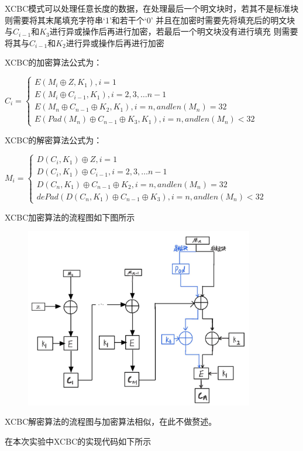 \documentclass[a4paper,11pt,UTF8]{ctexart}
\newcommand{\bottomcaption}{%
\setlength{\abovecaptionskip}{6pt}%
\setlength{\belowcaptionskip}{6pt}%
\caption}
\newcommand{\xiaowuhao}{\fontsize{9pt}{\baselineskip}\selectfont}   %
\begin{document}
            XCBC模式可以处理任意长度的数据，在处理最后一个明文块时，若其不是标准块则需要将其末尾填充字符串‘1’和若干个‘0’
            并且在加密时需要先将填充后的明文块与$C_{i-1}$和$K_{3}$进行异或操作后再进行加密，若最后一个明文块没有进行填充
            则需要将其与$C_{i-1}$和$K_{2}$进行异或操作后再进行加密\par
            XCBC的加密算法公式为：\par
            $C_{i}=\left\{\begin{matrix} E(M_{i}\oplus Z,K_{1}),i=1\\
                 E(M_{i}\oplus C_{i-1},K_{1}),i=2,3,\dots n-1\\
                E(M_{n}\oplus C_{n-1}\oplus K_{2},K_{1}),i=n,and len(M_{n})=32 \\
                E(Pad(M_{n})\oplus C_{n-1}\oplus K_{3},K_{1}),i=n,and len(M_{n})<32
                \end{matrix}\right.$\par
\newpage
            XCBC的解密算法公式为：\par
            $M_{i}=\left\{\begin{matrix} D(C_{i},K_{1})\oplus Z,i=1\\ 
                D(C_{i},K_{1})\oplus C_{i-1},i=2,3,\dots n-1\\
                D(C_{n},K_{1})\oplus C_{n-1}\oplus K_{2},i=n,and len(M_{n})=32 \\
                dePad(D(C_{n},K_{1})\oplus C_{n-1}\oplus K_{3}),i=n,and len(M_{n})<32 \end{matrix}\right.$
            
            XCBC加密算法的流程图如下图所示
            \begin{figure}[H]
                \centering
                \includegraphics[width=10cm]{XCBC加密.jpg}
                \bottomcaption{\xiaowuhao{XCBC加密流程}}
            \end{figure}
            XCBC解密算法的流程图与加密算法相似，在此不做赘述。\par
            在本次实验中XCBC的实现代码如下所示
            
\end{document}
